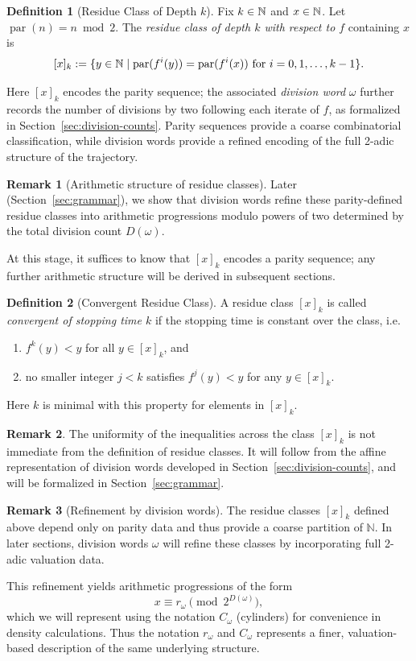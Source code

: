 \documentclass[12pt, oneside]{article}   	%
\numberwithin{equation}{section}          %
\theoremstyle{definition}
\newtheorem{define}{Definition}[section]
\newtheorem*{remark}{Remark}
\begin{document}
\begin{define}[Residue Class of Depth \(k\)]
\label{def:residue-class}
Fix \(k \in \mathbb{N}\) and \(x \in \mathbb{N}\). Let $\operatorname{par}(n)=n\bmod 2$.
The \emph{residue class of depth \(k\) with respect to \(f\)} containing \(x\) is
\[
[x]_k := \{ y \in \mathbb{N} \mid \operatorname{par}(f^i(y)) = \operatorname{par}(f^i(x))
\text{ for } i = 0, 1, \dots, k-1 \}.
\]
\end{define}
Here \([x]_k\) encodes the parity sequence; the associated \emph{division word} \(\omega\)
further records the number of divisions by two following each iterate of $f$, as formalized
in Section~\ref{sec:division-counts}. Parity sequences provide a coarse combinatorial classification,
while division words provide a refined encoding of the full 2-adic structure of the trajectory.

\begin{remark}[Arithmetic structure of residue classes]
Later (Section~\ref{sec:grammar}), we show that division words refine
these parity-defined residue classes into arithmetic progressions
modulo powers of two determined by the total division count $D(\omega)$.

At this stage, it suffices to know that $[x]_k$ encodes a parity sequence;
any further arithmetic structure  will be derived in subsequent sections.
\end{remark}

\begin{define}[Convergent Residue Class]
A residue class $[x]_k$ is called \emph{convergent of stopping time $k$} if
the stopping time is constant over the class, i.e.
\begin{enumerate}
\item $f^k(y) < y$ for all $y \in [x]_k$, and
\item no smaller integer $j<k$ satisfies $f^j(y) < y$ for any $y \in [x]_k$.
\end{enumerate}
Here $k$ is minimal with this property for elements in $[x]_k$.
\end{define}

\begin{remark}
The uniformity of the inequalities across the class $[x]_k$ is not immediate
from the definition of residue classes. It will follow from the affine
representation of division words developed in Section~\ref{sec:division-counts},
and will be formalized in Section~\ref{sec:grammar}.
\end{remark}

\begin{remark}[Refinement by division words]
The residue classes $[x]_k$ defined above depend only on parity data and
thus provide a coarse partition of $\mathbb{N}$. In later sections, division
words $\omega$ will refine these classes by incorporating full 2-adic
valuation data. 

This refinement yields arithmetic progressions of the form
\[
x \equiv r_\omega \pmod{2^{D(\omega)}},
\]
which we will represent using the notation $C_\omega$ (cylinders) for
convenience in density calculations. Thus the notation
$r_\omega$ and $C_\omega$ represents a finer, valuation-based
description of the same underlying structure.
\end{remark}
\end{document}
